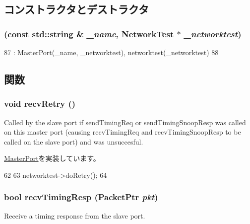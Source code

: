 \subsection{コンストラクタとデストラクタ}
\hypertarget{classNetworkTest_1_1CpuPort_abf09ddb6b9a4ab46cbada0e219ae2617}{
\subsubsection[{CpuPort}]{ (const std::string \& {\em \_\-name}, \/  {\bf NetworkTest} $\ast$ {\em \_\-networktest})}}
\label{classNetworkTest_1_1CpuPort_abf09ddb6b9a4ab46cbada0e219ae2617}



\begin{DoxyCode}
87             : MasterPort(_name, _networktest), networktest(_networktest)
88         { }
\end{DoxyCode}


\subsection{関数}
\hypertarget{classNetworkTest_1_1CpuPort_a29cb5a4f98063ce6e9210eacbdb35298}{
\subsubsection[{recvRetry}]{\setlength{\rightskip}{0pt plus 5cm}void recvRetry ()}}
\label{classNetworkTest_1_1CpuPort_a29cb5a4f98063ce6e9210eacbdb35298}
Called by the slave port if sendTimingReq or sendTimingSnoopResp was called on this master port (causing recvTimingReq and recvTimingSnoopResp to be called on the slave port) and was unsuccesful. 

\hyperlink{classMasterPort_ac1ccc3bcf7ebabb20b57fab99b2be5b0}{MasterPort}を実装しています。


\begin{DoxyCode}
62 {
63     networktest->doRetry();
64 }
\end{DoxyCode}
\hypertarget{classNetworkTest_1_1CpuPort_a482dba5588f4bee43e498875a61e5e0b}{
\subsubsection[{recvTimingResp}]{\setlength{\rightskip}{0pt plus 5cm}bool recvTimingResp ({\bf PacketPtr} {\em pkt})}}
\label{classNetworkTest_1_1CpuPort_a482dba5588f4bee43e498875a61e5e0b}
Receive a timing response from the slave port. 

